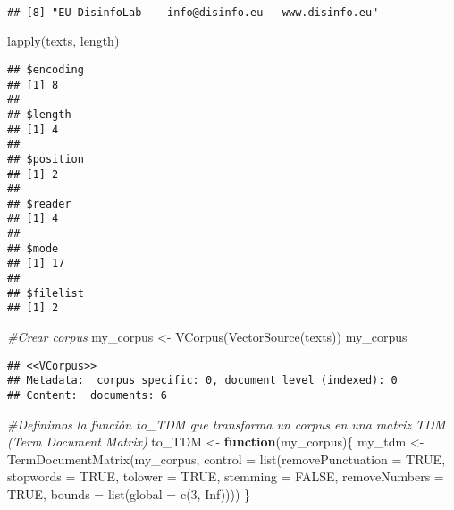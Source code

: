 \documentclass[
]{book}
\newenvironment{Shaded}{\begin{snugshade}}{\end{snugshade}}
\newcommand{\AttributeTok}[1]{\textcolor[rgb]{0.77,0.63,0.00}{#1}}
\newcommand{\CommentTok}[1]{\textcolor[rgb]{0.56,0.35,0.01}{\textit{#1}}}
\newcommand{\ConstantTok}[1]{\textcolor[rgb]{0.00,0.00,0.00}{#1}}
\newcommand{\ControlFlowTok}[1]{\textcolor[rgb]{0.13,0.29,0.53}{\textbf{#1}}}
\newcommand{\DecValTok}[1]{\textcolor[rgb]{0.00,0.00,0.81}{#1}}
\newcommand{\FunctionTok}[1]{\textcolor[rgb]{0.00,0.00,0.00}{#1}}
\newcommand{\NormalTok}[1]{#1}
\newcommand{\OtherTok}[1]{\textcolor[rgb]{0.56,0.35,0.01}{#1}}
\begin{document}
\begin{verbatim}
                                                                                                                                                                                                                                                                                             
## [8] "EU DisinfoLab –– info@disinfo.eu – www.disinfo.eu"
\end{verbatim}

\begin{Shaded}
\begin{Highlighting}[]
\FunctionTok{lapply}\NormalTok{(texts, length)}
\end{Highlighting}
\end{Shaded}

\begin{verbatim}
## $encoding
## [1] 8
## 
## $length
## [1] 4
## 
## $position
## [1] 2
## 
## $reader
## [1] 4
## 
## $mode
## [1] 17
## 
## $filelist
## [1] 2
\end{verbatim}

\begin{Shaded}
\begin{Highlighting}[]
\CommentTok{\#Crear corpus}
\NormalTok{my\_corpus }\OtherTok{\textless{}{-}} \FunctionTok{VCorpus}\NormalTok{(}\FunctionTok{VectorSource}\NormalTok{(texts))}
\NormalTok{my\_corpus}
\end{Highlighting}
\end{Shaded}

\begin{verbatim}
## <<VCorpus>>
## Metadata:  corpus specific: 0, document level (indexed): 0
## Content:  documents: 6
\end{verbatim}

\begin{Shaded}
\begin{Highlighting}[]
\CommentTok{\#Definimos la función to\_TDM que transforma un corpus en una matriz TDM (Term Document Matrix)}
\NormalTok{to\_TDM }\OtherTok{\textless{}{-}} \ControlFlowTok{function}\NormalTok{(my\_corpus)\{}
\NormalTok{  my\_tdm }\OtherTok{\textless{}{-}} \FunctionTok{TermDocumentMatrix}\NormalTok{(my\_corpus, }
                                   \AttributeTok{control =} 
                                     \FunctionTok{list}\NormalTok{(}\AttributeTok{removePunctuation =} \ConstantTok{TRUE}\NormalTok{,}
                                          \AttributeTok{stopwords =} \ConstantTok{TRUE}\NormalTok{,}
                                          \AttributeTok{tolower =} \ConstantTok{TRUE}\NormalTok{,}
                                          \AttributeTok{stemming =} \ConstantTok{FALSE}\NormalTok{,}
                                          \AttributeTok{removeNumbers =} \ConstantTok{TRUE}\NormalTok{,}
                                          \AttributeTok{bounds =} \FunctionTok{list}\NormalTok{(}\AttributeTok{global =} \FunctionTok{c}\NormalTok{(}\DecValTok{3}\NormalTok{, }\ConstantTok{Inf}\NormalTok{))))}
\NormalTok{\}                               }
\end{Highlighting}
\end{Shaded}
\end{document}
